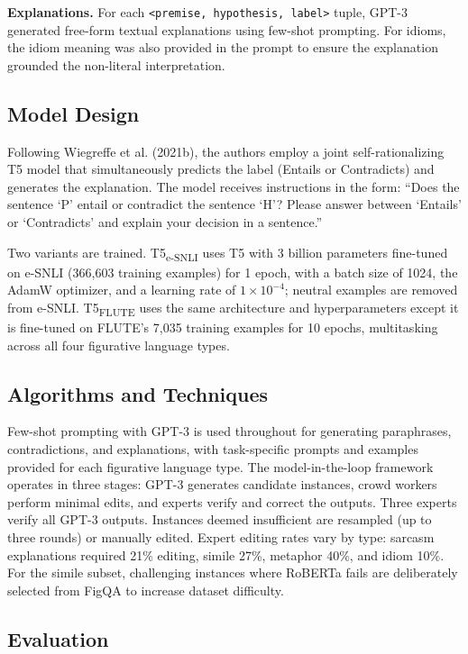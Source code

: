 \documentclass[12pt]{article}
\begin{document}
\textbf{Explanations.} For each \texttt{<premise, hypothesis, label>} tuple, GPT-3 generated free-form textual explanations using few-shot prompting. For idioms, the idiom meaning was also provided in the prompt to ensure the explanation grounded the non-literal interpretation.

\subsection{Model Design}

Following Wiegreffe et al. (2021b), the authors employ a joint self-rationalizing T5 model that simultaneously predicts the label (Entails or Contradicts) and generates the explanation. The model receives instructions in the form: ``Does the sentence `P' entail or contradict the sentence `H'? Please answer between `Entails' or `Contradicts' and explain your decision in a sentence.''

Two variants are trained. T5\textsubscript{e-SNLI} uses T5 with 3 billion parameters fine-tuned on e-SNLI (366,603 training examples) for 1 epoch, with a batch size of 1024, the AdamW optimizer, and a learning rate of $1 \times 10^{-4}$; neutral examples are removed from e-SNLI. T5\textsubscript{FLUTE} uses the same architecture and hyperparameters except it is fine-tuned on FLUTE's 7,035 training examples for 10 epochs, multitasking across all four figurative language types.

\subsection{Algorithms and Techniques}

Few-shot prompting with GPT-3 is used throughout for generating paraphrases, contradictions, and explanations, with task-specific prompts and examples provided for each figurative language type. The model-in-the-loop framework operates in three stages: GPT-3 generates candidate instances, crowd workers perform minimal edits, and experts verify and correct the outputs. Three experts verify all GPT-3 outputs. Instances deemed insufficient are resampled (up to three rounds) or manually edited. Expert editing rates vary by type: sarcasm explanations required 21\% editing, simile 27\%, metaphor 40\%, and idiom 10\%. For the simile subset, challenging instances where RoBERTa fails are deliberately selected from FigQA to increase dataset difficulty.

\subsection{Evaluation}
\end{document}
